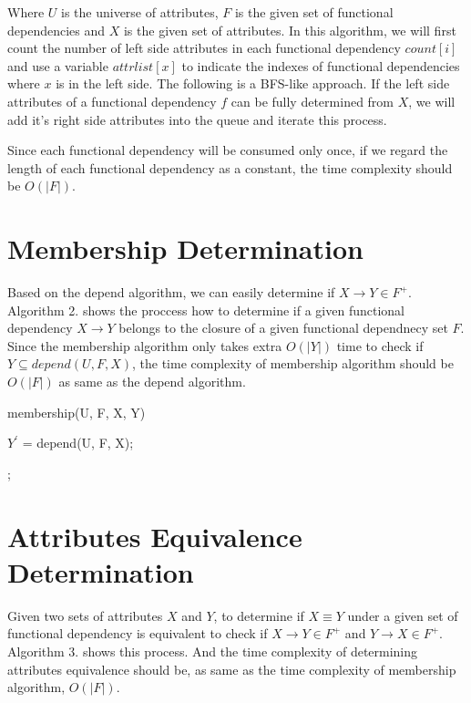 \documentclass[11pt]{book}
\begin{document}
Where $U$ is the universe of attributes, $F$ is the given set of functional dependencies and $X$ is the given set of attributes. In this algorithm, we will first count the number of left side attributes in each functional dependency $count[i]$ and use a variable $attrlist[x]$ to indicate the indexes of functional dependencies where $x$ is in the left side. The following is a BFS-like approach.
If the left side attributes of a functional dependency $f$ can be fully determined from $X$, we will add it's right side attributes into the queue and iterate this process.

Since each functional dependency will be consumed only once, if we regard the length of each functional dependency as a constant, the time complexity should be $O(\lvert F \rvert)$.

\section{Membership Determination}

Based on the depend algorithm, we can easily determine if $X \rightarrow Y \in F^+$. Algorithm 2. shows the proccess how to determine if a given functional dependency $X \to Y$ belongs to the closure of a given functional dependnecy set $F$. Since the membership algorithm only takes extra $O(|Y|)$ time to check if $Y \subseteq depend(U, F, X)$, the time complexity of membership algorithm should be $O(|F|)$ as same as the depend algorithm.

\begin{algorithm}

  \caption{membership(U, F, X, Y)}

  \SetAlgoLined

  $Y^{'}$ = depend(U, F, X);
  
  
  ;

\end{algorithm}

\section{Attributes Equivalence Determination}

Given two sets of attributes $X$ and $Y$, to determine if $X \equiv Y$ under a given set of functional dependency is equivalent to check if $X \rightarrow Y \in F^{+}$ and $Y \rightarrow X \in F^{+}$. Algorithm 3. shows this process. And the time complexity of determining attributes equivalence should be, as same as the time complexity of membership algorithm, $O(|F|)$.
\end{document}
